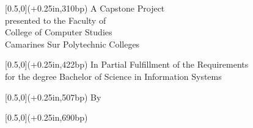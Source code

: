 \preliminarylayout
\thispagestyle{preliminaryhidden}

\PreliminaryTitle[false]{\MakeUppercase{\CapstoneTitle}}
\singlespacing
\begin{center}
    \coverTitle{\CoverTitleLineOne}
    \coverTitle{\CoverTitleLineTwo}
    \coverTitle{\CoverTitleLineThree}
    \coverTitle{\CoverTitleLineFour}

    \begin{textblock*}{\textwidth}[0.5,0](\paperwidth+0.25in\relax,310bp)
        A Capstone Project\\
        presented to the Faculty of\\
        College of Computer Studies\\
        Camarines Sur Polytechnic Colleges
    \end{textblock*}
    
    \begin{textblock*}{\textwidth}[0.5,0](\paperwidth+0.25in\relax,422bp)
        In Partial Fulfillment of the Requirements\\
        for the degree Bachelor of Science in Information Systems\\
    \end{textblock*}

    \begin{textblock*}{\textwidth}[0.5,0](\paperwidth+0.25in\relax,507bp)
        \centering
        By\par
        \AuthorOne\par
        \OptionalAuthorCoverPage{\AuthorTwo}
        \OptionalAuthorCoverPage{\AuthorThree}
        \OptionalAuthorCoverPage{\AuthorFour}
        \OptionalAuthorCoverPage{\AuthorFive}
    \end{textblock*}

    \begin{textblock*}{\textwidth}[0.5,0](\paperwidth+0.25in\relax,690bp)
        \CoverDate
    \end{textblock*}
\end{center}
\clearpage